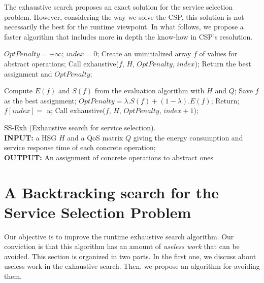 \documentclass[a4paper]{article}
\begin{document}
The exhaustive search proposes an exact solution for the service selection problem. However, considering 
the way we solve the CSP, this solution is not necessarily the best for the runtime viewpoint. 
In what follows, we propose a faster algorithm that includes more in depth the know-how in CSP's resolution. 


\scriptsize
\begin{algorithm}[H]                    
\begin{algorithmic}[1]
\scriptsize
{}
        \State $OptPenalty = +\infty$;  $index = 0$;
	\State Create an uninitialized array $f$ of values for abstract operations;
	\State Call exhaustive($f$, $H$, $OptPenalty$, $index$);
	\State Return the best assignment and $OptPenalty$;
\EndFunction

	\State Compute $E(f)$ and $S(f)$ from the evaluation algorithm with $H$ and $Q$;
			\State Save $f$ as the best assignment;
			\State $OptPenalty = \lambda.S(f) + (1-\lambda).E(f)$;
		\EndIf
	\EndIf
	\State Return;
\EndIf
{}
\State $f[index] =$ $u$;
\State Call exhaustive($f$, $H$, $OptPenalty$,  $index+1$);
\EndFor
\EndFunction

\normalsize
\end{algorithmic}
\caption{\scriptsize SS-Exh (Exhaustive search for service selection). \\ {\bf INPUT:} a HSG $H$ and a QoS matrix $Q$ giving the energy consumption and 
service response time of each concrete operation;  \\ {\bf OUTPUT:} An assignment of concrete operations to abstract ones }
\label{alg:Exhaustive}  
\end{algorithm}
\normalsize


\section{A Backtracking search for the Service Selection Problem} \label{backtrackingSearch}

Our objective is to improve the runtime exhaustive search algorithm. Our conviction is that 
this algorithm has an amount of {\it useless work} that can be avoided. This section is 
organized in two parts. In the first one, we discuss about useless work in the exhaustive search. Then, we 
propose an algorithm for avoiding them. 
\end{document}
